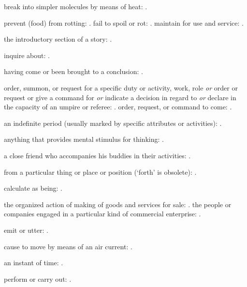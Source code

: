  break into simpler molecules by means of heat: .

  prevent (food) from rotting:   . fail to spoil or rot:   . maintain for use and service:   .

  the introductory section of a story:   .

  inquire about:   .

  having come or been brought to a conclusion:   .

  order, summon, or request for a specific duty or activity, work, role \textit{or} order or request or give a command for \textit{or} indicate a decision in regard to \textit{or} declare in the capacity of an umpire or referee: . order, request, or command to come:   .

  an indefinite period (usually marked by specific attributes or activities): .

  anything that provides mental stimulus for thinking:   .

  a close friend who accompanies his buddies in their activities:   .

  from a particular thing or place or position (`forth' is obsolete):   .

  calculate as being: .

  the organized action of making of goods and services for sale:   . the people or companies engaged in a particular kind of commercial enterprise: .

  emit or utter: .

  cause to move by means of an air current: .

  an instant of time:   .

  perform or carry out: .

